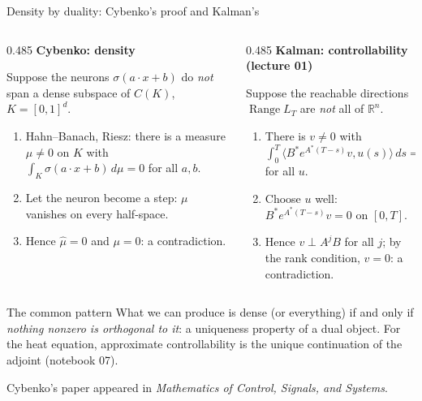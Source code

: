 \documentclass[10pt]{beamer}
\newcommand{\R}{\mathbb{R}}
\DeclareMathOperator{\Range}{Range}
\begin{document}
\begin{frame}{Density by duality: Cybenko's proof and Kalman's}
\footnotesize
\begin{columns}[T,onlytextwidth]
\begin{column}{0.485\textwidth}
\alert{\textbf{Cybenko: density}}

\smallskip
Suppose the neurons $\sigma(a\cdot x+b)$ do \emph{not} span a dense subspace of $C(K)$, $K=[0,1]^d$.
\begin{enumerate}
\item Hahn--Banach, Riesz: there is a measure $\mu\neq0$ on $K$ with
$\int_K\sigma(a\cdot x+b)\,d\mu=0$ for all $a,b$.
\item Let the neuron become a step: $\mu$ vanishes on every half-space.
\item Hence $\hat\mu=0$ and $\mu=0$: a contradiction.
\end{enumerate}
\end{column}
\begin{column}{0.485\textwidth}
\alert{\textbf{Kalman: controllability (lecture 01)}}

\smallskip
Suppose the reachable directions $\Range L_T$ are \emph{not} all of $\R^n$.
\begin{enumerate}
\item There is $v\neq0$ with
$\int_0^T\langle B^*e^{A^*(T-s)}v,u(s)\rangle\,ds=0$ for all $u$.
\item Choose $u$ well: $B^*e^{A^*(T-s)}v=0$ on $[0,T]$.
\item Hence $v\perp A^jB$ for all $j$; by the rank condition, $v=0$: a contradiction.
\end{enumerate}
\end{column}
\end{columns}

\medskip
\begin{mathbox}{The common pattern}
What we can produce is dense (or everything) if and only if \emph{nothing nonzero is orthogonal to it}: a \alert{uniqueness} property of a dual object. For the heat equation, approximate controllability is the unique continuation of the adjoint (notebook 07).
\end{mathbox}
\scriptsize Cybenko's paper appeared in \emph{Mathematics of Control, Signals, and Systems}.
\end{frame}
\end{document}
